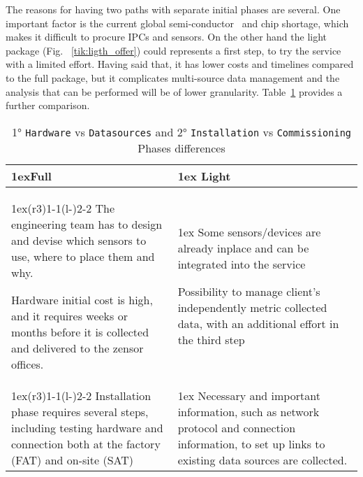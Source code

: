 The reasons for having two paths with separate initial phases are several. One important factor is the current global semi-conductor~\cite{Article:bbcnews_2021_chip} and chip shortage,
which makes it difficult to procure \ac{IPCs} and sensors.
On the other hand the light package (Fig. ~\ref{tik:ligth_offer}) could represents a first step, to try the service with a limited effort.
Having said that, it has lower costs and timelines compared to the full package, but it complicates multi-source data management and the analysis that can be performed will be of lower granularity.
Table~\ref*{tab:phase_diff} provides a further comparison.
\begin{table}[ht]
	\begin{tabularx}{\textwidth}{>{\parskip1ex}X@{\kern4\tabcolsep}>{\parskip1ex}X}
		\toprule
		\hfil\bfseries Full
		 &
		\hfil\bfseries Light
		\\\cmidrule(r{3\tabcolsep}){1-1}\cmidrule(l{-\tabcolsep}){2-2}
		The engineering team has to design and devise which sensors to use, where to place them and why.\par
		Hardware initial cost is high, and it requires weeks or months before it is collected and delivered to the zensor offices.\par
		 &
		Some sensors/devices are already inplace and can be integrated into the service\par
		Possibility to manage client's independently metric collected data, with an additional effort in the third step\par
		\\\cmidrule(r{3\tabcolsep}){1-1}\cmidrule(l{-\tabcolsep}){2-2}
		Installation phase requires several steps, including testing hardware and connection both at the factory (FAT) and on-site (SAT)\par
		 &
		Necessary and important information, such as network protocol and connection information, to set up links to existing data sources are collected.\par
		\\\bottomrule
	\end{tabularx}
	\caption[1° and 2° Phases differences]{1° \texttt{Hardware} vs \texttt{Datasources} and 2° \texttt{Installation} vs \texttt{Commissioning} Phases differences}
	\label{tab:phase_diff}
\end{table}

